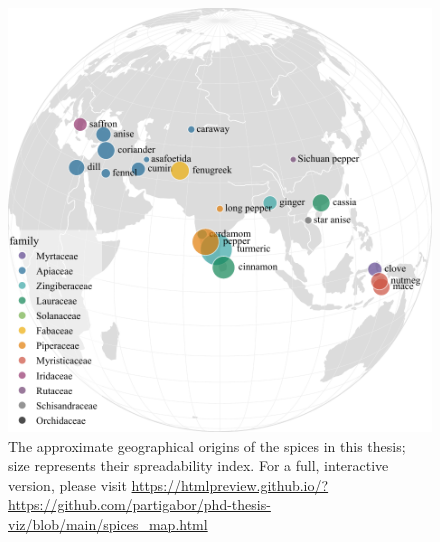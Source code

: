 \begin{figure}[ht!]
  \includegraphics[width=\linewidth]{imgs/plots/distribution_with_spreadability.pdf}
  \caption[The approximate geographical origins of the spices in this thesis.]{The approximate geographical origins of the spices in this thesis; size represents their spreadability index. For a full, interactive version, please visit \url{https://htmlpreview.github.io/?https://github.com/partigabor/phd-thesis-viz/blob/main/spices_map.html}}
  \label{fig:spices_map}
\end{figure}



